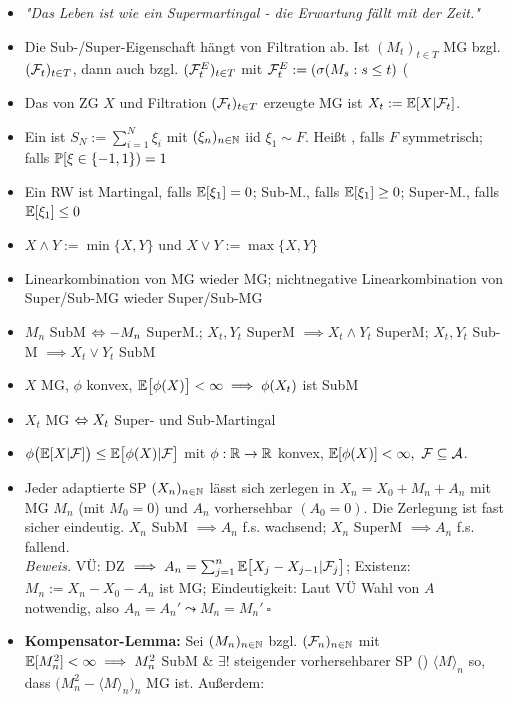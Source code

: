 \documentclass[12pt]{scrartcl}
\begin{document}
\begin{itemize}
		\item \textit{"Das Leben ist wie ein Supermartingal - die Erwartung fällt mit der Zeit."}
		\item Die Sub-/Super-Eigenschaft hängt von Filtration ab.
		Ist $(M_t)_{t\in T}$ MG bzgl. $(\F_t)_{t\in T}$, dann auch bzgl. $(\F_t^E)_{t\in T}$ mit $\F_t^E:=(\sigma(M_s:s\leq t)$ (
		\item Das von ZG $X$ und Filtration $(\F_t)_{t\in T}$ erzeugte MG ist $X_t:=\E[X|\F_t]$.
		\item Ein  ist $S_N:=\sum_{i=1}^N\xi_i$ mit $(\xi_n)_{n\in\N}$ iid $\xi_1\sim F$.
		Heißt , falls $F$ symmetrisch;  falls $\P[\xi\in\lbrace-1,1\rbrace)=1$
		\item Ein RW ist Martingal, falls $\E[\xi_1]=0$; Sub-M., falls $\E[\xi_1]\geq0$; Super-M., falls $\E[\xi_1]\leq0$
		\item $X\wedge Y:=\min\lbrace X,Y\rbrace$ und $X\vee Y:=\max\lbrace X,Y\rbrace$
		\item Linearkombination von MG wieder MG; nichtnegative Linearkombination von Super/Sub-MG wieder Super/Sub-MG
		\item $M_n$ SubM $\gdw -M_n$ SuperM.; $X_t,Y_t$ SuperM $\implies X_t\wedge Y_t$ SuperM; $X_t,Y_t$ Sub-M $\implies X_t\vee Y_t$ SubM
		\item $X$ MG, $\phi$ konvex, $\E\big[\phi(X)\big]<\infty\implies \phi(X_t)$ ist SubM
		\item $X_t$ MG $\gdw X_t$ Super- und Sub-Martingal
		\item {} $\phi\big(\E[X|\F]\big)\leq\E\big[\phi(X)|\F\big]$ mit $\phi:\R\to\R$ konvex, $\E[\phi(X)]<\infty,~\F\subseteq\A$.
		\item {} Jeder adaptierte SP $(X_n)_{n\in\N}$ lässt sich zerlegen in $X_n=X_0+M_n+A_n$ mit MG $M_n$ (mit $M_0=0$) und $A_n$ vorhersehbar $(A_0=0)$. Die Zerlegung ist fast sicher eindeutig.
		$X_n$ SubM $\implies A_n$ f.s. wachsend; $X_n$ SuperM $\implies A_n$ f.s. fallend.\\
		\textit{Beweis.} VÜ: DZ $\implies A_n=\sum_{j=1}^n\E\big[X_j-X_{j-1}|\F_j\big]$; Existenz: $M_n:=X_n-X_0-A_n$ ist MG; Eindeutigkeit: Laut VÜ Wahl von $A$ notwendig, also $A_n=A_n'\leadsto M_n=M_n'~\square$
		\item \textbf{Kompensator-Lemma:} Sei $(M_n)_{n\in\N}$ bzgl. $(\F_n)_{n\in\N}$ mit $\E[M_n^2]<\infty\implies M_n^2$ SubM \& $\exists!$ steigender vorhersehbarer SP () $\langle M\rangle_n$ so, dass $\big(M_n^2-\langle M\rangle_n\big)_n$ MG ist. Außerdem:\\

\end{itemize}
\end{document}
